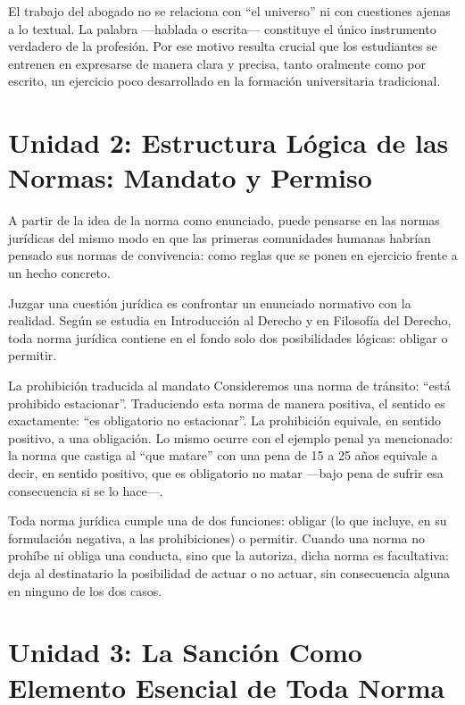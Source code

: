 \documentclass[12pt,oneside]{book}
\begin{document}
El trabajo del abogado no se relaciona con ``el universo'' ni con cuestiones ajenas a lo textual. La palabra ---hablada o escrita--- constituye el único instrumento verdadero de la profesión. Por ese motivo resulta crucial que los estudiantes se entrenen en expresarse de manera clara y precisa, tanto oralmente como por escrito, un ejercicio poco desarrollado en la formación universitaria tradicional.

\section{Unidad 2: Estructura Lógica de las Normas: Mandato y Permiso}

A partir de la idea de la norma como enunciado, puede pensarse en las normas jurídicas del mismo modo en que las primeras comunidades humanas habrían pensado sus normas de convivencia: como reglas que se ponen en ejercicio frente a un hecho concreto.

Juzgar una cuestión jurídica es confrontar un enunciado normativo con la realidad. Según se estudia en Introducción al Derecho y en Filosofía del Derecho, toda norma jurídica contiene en el fondo solo dos posibilidades lógicas: obligar o permitir.

\begin{example}{La prohibición traducida al mandato}
Consideremos una norma de tránsito: ``está prohibido estacionar''. Traduciendo esta norma de manera positiva, el sentido es exactamente: ``es obligatorio no estacionar''. La prohibición equivale, en sentido positivo, a una obligación. Lo mismo ocurre con el ejemplo penal ya mencionado: la norma que castiga al ``que matare'' con una pena de 15 a 25 años equivale a decir, en sentido positivo, que es obligatorio no matar ---bajo pena de sufrir esa consecuencia si se lo hace---.
\end{example}

\begin{important}
Toda norma jurídica cumple una de dos funciones: obligar (lo que incluye, en su formulación negativa, a las prohibiciones) o permitir. Cuando una norma no prohíbe ni obliga una conducta, sino que la autoriza, dicha norma es facultativa: deja al destinatario la posibilidad de actuar o no actuar, sin consecuencia alguna en ninguno de los dos casos.
\end{important}

\section{Unidad 3: La Sanción Como Elemento Esencial de Toda Norma}
\end{document}
